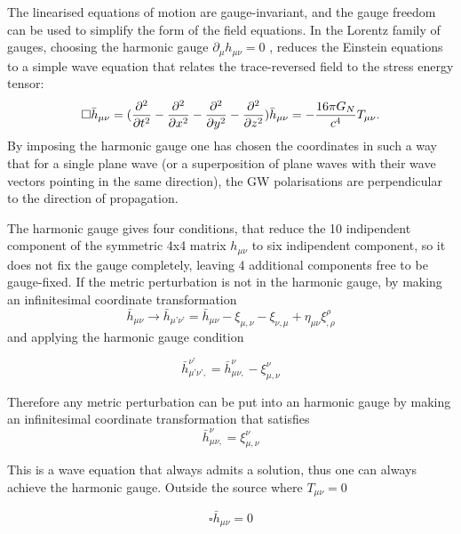 \documentclass[binding=0.6cm, LaM]{sapthesis}
\begin{document}
The linearised equations of motion are gauge-invariant, and the gauge freedom can
 be used to simplify the form of the field equations.
 In the Lorentz family of gauges, choosing the harmonic gauge 
 $ \partial_{\mu}h_{\mu\nu} = 0 $ 
 , reduces the Einstein equations to a simple wave equation that relates the trace-reversed field
 to the stress energy tensor:
\begin{equation}
\square {\bar h}_{\mu\nu} =({\partial^2 \over {\partial t^2} } - {\partial^2 \over {\partial x^2}}  - {\partial^2 \over {\partial y^2}}  -  {\partial^2 \over {\partial z^2}}) {\bar h}_{\mu\nu} = -{{16\pi G_{N}} \over {c^4}}T_{\mu\nu}. 
\end{equation}
By imposing the harmonic gauge one has chosen the coordinates in such a way that for a single plane wave (or a superposition of plane waves with their wave vectors pointing in the same direction), 
the GW polarisations are perpendicular to the direction of propagation.

The harmonic gauge gives four conditions, that reduce the 10 indipendent component of the symmetric 4x4 matrix $h_{\mu\nu}$ to six indipendent component, so it does not fix the gauge completely, 
leaving 4 additional components free to be gauge-fixed.  
If the metric perturbation is not in the harmonic gauge, by making an infinitesimal coordinate transformation 
\begin{equation}
{\bar h}_{\mu\nu} \rightarrow {\bar h}_{\mu’\nu’}  = {\bar h}_{\mu\nu}  - \xi_{\mu,\nu} -\xi_{\nu,\mu} + \eta_{\mu\nu}\xi^{\rho}_{,\rho}
\end{equation}
and applying the harmonic gauge condition

\begin{equation}
{\bar h}_{\mu’\nu’,} ^{\nu’} = {\bar h}_{\mu\nu,} ^{\nu} - \xi_{\mu,\nu}^{\nu}
\end{equation}

Therefore any metric perturbation can be put into an harmonic gauge by making an infinitesimal coordinate transformation that satisfies 
\begin{equation}
{\bar h}_{\mu\nu,} ^{\nu} = \xi_{\mu,\nu}^{\nu}
\end{equation}

This is a wave equation that always admits a solution, thus one can always achieve the harmonic gauge. 
Outside the source where $T_{\mu\nu} = 0$ 

\begin{equation}
\square {\bar h}_{\mu\nu} = 0
\end{equation}
\end{document}
